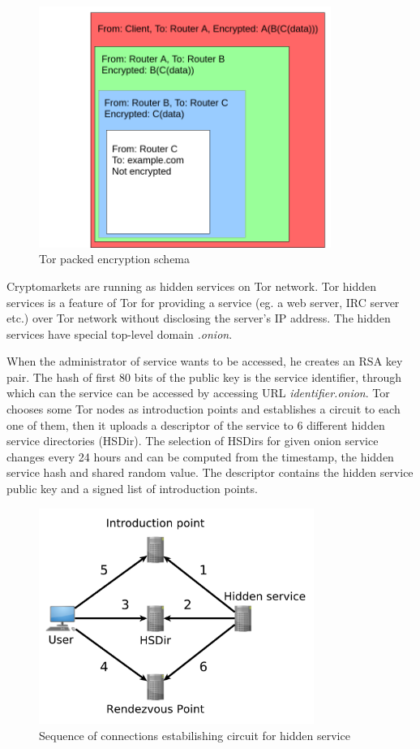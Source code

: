 \documentclass[
  digital, %
  table,   %
  lof,     %
  lot,     %
  oneside
]{fithesis3}
\begin{document}
\begin{figure}[!htb]
    \centering
    \includegraphics[width=0.85\textwidth]{tor-packet}
    \caption{Tor packed encryption schema}
    \label{tor-packet}
\end{figure}
 
Cryptomarkets are running as hidden services on Tor network.
Tor hidden services is a feature of Tor for providing a service (eg. a web server, IRC server etc.) over Tor network
without disclosing the server's IP address. The hidden services have special top-level domain \emph{.onion}.

When the administrator of service wants to be accessed, he creates an RSA key pair.
The hash of first 80 bits of the public key is the service identifier,
through which can the service can be accessed by accessing URL \emph{identifier.onion}.
Tor chooses some Tor nodes as introduction points and establishes a circuit to each one of them,
then it uploads a descriptor of the service to 6 different hidden service directories (HSDir).
The selection of HSDirs for given onion service
changes every 24 hours and can be computed from the timestamp, the hidden service hash and shared random value.
The descriptor contains the hidden service public key and a signed list of introduction points.

\begin{figure}[!htb]
    \centering
    \includegraphics[width=0.8\textwidth]{onion.pdf}
    \caption{Sequence of connections estabilishing circuit for hidden service}
    \label{onionservice}
\end{figure}
\end{document}
